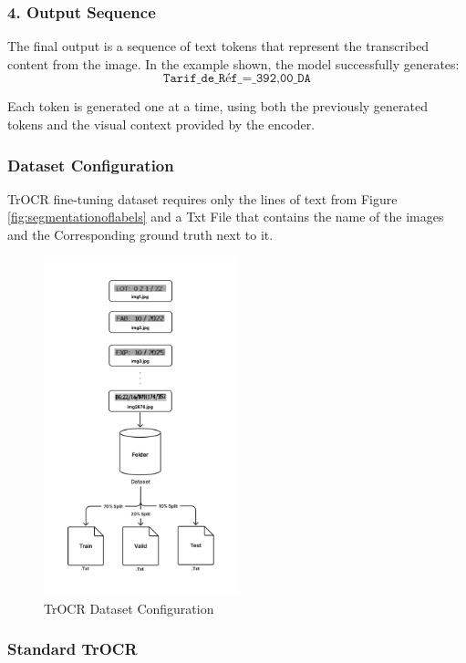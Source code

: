 \subsubsection*{4. Output Sequence}

The final output is a sequence of text tokens that represent the transcribed content from the image. In the example shown, the model successfully generates:
\[
\texttt{Tarif\_de\_Réf\_=\_392,00\_DA}
\]

Each token is generated one at a time, using both the previously generated tokens and the visual context provided by the encoder.

\subsubsection{Dataset Configuration}
TrOCR fine-tuning dataset requires only the lines of text from Figure \ref{fig:segmentationoflabels} and a Txt File that contains the name of the images and the Corresponding ground truth next to it.

\begin{figure}[H]
    \centering
    \includegraphics[width=0.50\textwidth]{Figures/Chapter 3/trocr_dataset_configuration.png}
    \caption{TrOCR Dataset Configuration}
    \label{fig:TrOCRdatasetconfiguration}
\end{figure}

\subsubsection{Standard TrOCR}

